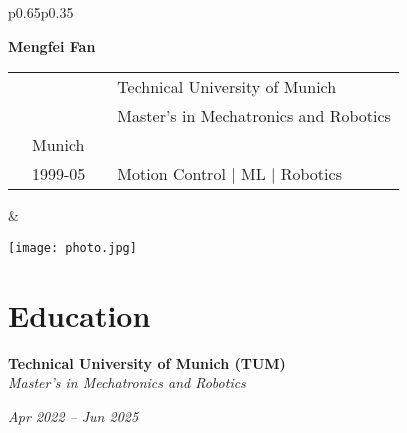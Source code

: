\documentclass[10pt, letterpaper]{article}
\newenvironment{twocolentry}[2][]{
    \onecolentry
    \def\secondColumn{#2}
    \setcolumnwidth{\fill, 4.5 cm}
    \begin{paracol}{2}
}{
    \switchcolumn \raggedleft \secondColumn
    \end{paracol}
    \endonecolentry
}
\newenvironment{header}{
    \setlength{\topsep}{0pt}\par\kern\topsep\centering\linespread{1.5}
}{
    \par\kern\topsep
}
\let\hrefWithoutArrow\href
\renewcommand{\href}[2]{\hrefWithoutArrow{#1}{\ifthenelse{\equal{#2}{}}{ }{#2 }\raisebox{.15ex}{\footnotesize \faExternalLink*}}}
\begin{document}
    \newcommand{\AND}{\unskip
        \cleaders\copy\ANDbox\hskip\wd\ANDbox
        \ignorespaces
    }
    \newsavebox\ANDbox
    \sbox\ANDbox{}

    \begin{header}
        \begin{tabular}{p{}p{}}
            \begin{flushleft}
                \textbf{\fontsize{28pt}{28pt}\selectfont Mengfei Fan}
                
                \vspace{0.5cm}
                
                \begin{tabular}{ll@{\hspace{1cm}}ll}
                    \faEnvelope[regular] & \hrefWithoutArrow{mailto:mengfeifan517@163.com}{mengfeifan517@163.com} & \faUniversity & Technical University of Munich \\
                    \faPhone* & \hrefWithoutArrow{tel:+49-162-8967744}{+49 1628967744} & \faGraduationCap & Master's in Mechatronics and Robotics \\
                    \faMapMarker* & Munich & \faLink & \hrefWithoutArrow{https://github.com/mengfei0517}{github.com/mengfei0517} \\
                    \faCalendar* & 1999-05 & \faSmileWink & Motion Control $|$ ML $|$ Robotics
                \end{tabular}
            \end{flushleft}
            & 
            \begin{flushright}
                \hspace{-15mm}
                \vspace{-15mm}
                \texttt{[image: photo.jpg]}
            \end{flushright}
        \end{tabular}
    \end{header}

    \vspace{0.3 cm}

    \section{Education}

    \begin{twocolentry}{\textit{Apr 2022 -- Jun 2025}}
        \textbf{Technical University of Munich (TUM)} \\
        \textit{Master's in Mechatronics and Robotics}
    \end{twocolentry}
\end{document}
